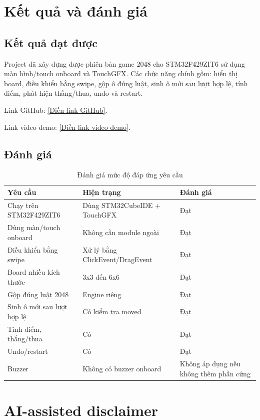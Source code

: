 \documentclass[12pt,a4paper]{article}
\begin{document}
\section{Kết quả và đánh giá}

\subsection{Kết quả đạt được}

Project đã xây dựng được phiên bản game 2048 cho STM32F429ZIT6 sử dụng màn hình/touch onboard và TouchGFX. Các chức năng chính gồm: hiển thị board, điều khiển bằng swipe, gộp ô đúng luật, sinh ô mới sau lượt hợp lệ, tính điểm, phát hiện thắng/thua, undo và restart.

Link GitHub: \url{[Điền link GitHub]}.

Link video demo: \url{[Điền link video demo]}.

\subsection{Đánh giá}

\begin{table}[H]
    \centering
    \begin{tabular}{p{8cm}p{4cm}p{2cm}}
        \toprule
        \textbf{Yêu cầu} & \textbf{Hiện trạng} & \textbf{Đánh giá} \\
        \midrule
        Chạy trên STM32F429ZIT6 & Dùng STM32CubeIDE + TouchGFX & Đạt \\
        Dùng màn/touch onboard & Không cần module ngoài & Đạt \\
        Điều khiển bằng swipe & Xử lý bằng ClickEvent/DragEvent & Đạt \\
        Board nhiều kích thước & 3x3 đến 6x6 & Đạt \\
        Gộp đúng luật 2048 & Engine riêng & Đạt \\
        Sinh ô mới sau lượt hợp lệ & Có kiểm tra moved & Đạt \\
        Tính điểm, thắng/thua & Có & Đạt \\
        Undo/restart & Có & Đạt \\
        Buzzer & Không có buzzer onboard & Không áp dụng nếu không thêm phần cứng \\
        \bottomrule
    \end{tabular}
    \caption{Đánh giá mức độ đáp ứng yêu cầu}
\end{table}

\section{AI-assisted disclaimer}
\end{document}

